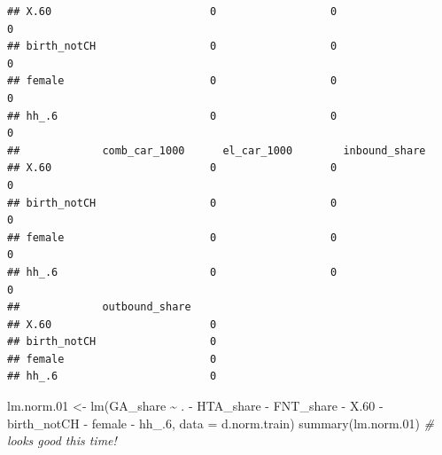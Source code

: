 \documentclass[
]{article}
\newenvironment{Shaded}{\begin{snugshade}}{\end{snugshade}}
\newcommand{\AttributeTok}[1]{\textcolor[rgb]{0.77,0.63,0.00}{#1}}
\newcommand{\CommentTok}[1]{\textcolor[rgb]{0.56,0.35,0.01}{\textit{#1}}}
\newcommand{\FloatTok}[1]{\textcolor[rgb]{0.00,0.00,0.81}{#1}}
\newcommand{\FunctionTok}[1]{\textcolor[rgb]{0.00,0.00,0.00}{#1}}
\newcommand{\NormalTok}[1]{#1}
\newcommand{\OtherTok}[1]{\textcolor[rgb]{0.56,0.35,0.01}{#1}}
\newcommand{\SpecialCharTok}[1]{\textcolor[rgb]{0.00,0.00,0.00}{#1}}
\begin{document}
\begin{verbatim}
## X.60                         0                  0                   0 
## birth_notCH                  0                  0                   0 
## female                       0                  0                   0 
## hh_.6                        0                  0                   0 
##             comb_car_1000      el_car_1000        inbound_share     
## X.60                         0                  0                  0
## birth_notCH                  0                  0                  0
## female                       0                  0                  0
## hh_.6                        0                  0                  0
##             outbound_share    
## X.60                         0
## birth_notCH                  0
## female                       0
## hh_.6                        0
\end{verbatim}

\begin{Shaded}
\begin{Highlighting}[]
\NormalTok{lm.norm}\FloatTok{.01} \OtherTok{\textless{}{-}} \FunctionTok{lm}\NormalTok{(GA\_share }\SpecialCharTok{\textasciitilde{}}\NormalTok{ . }\SpecialCharTok{{-}}\NormalTok{ HTA\_share }\SpecialCharTok{{-}}\NormalTok{ FNT\_share }\SpecialCharTok{{-}} 
\NormalTok{                   X}\FloatTok{.60} \SpecialCharTok{{-}}\NormalTok{ birth\_notCH }\SpecialCharTok{{-}}\NormalTok{ female }\SpecialCharTok{{-}}\NormalTok{ hh\_}\FloatTok{.6}\NormalTok{, }\AttributeTok{data =}\NormalTok{ d.norm.train)}
\FunctionTok{summary}\NormalTok{(lm.norm}\FloatTok{.01}\NormalTok{) }\CommentTok{\# looks good this time!}
\end{Highlighting}
\end{Shaded}
\end{document}
